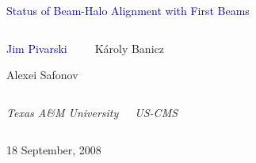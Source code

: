 \documentclass[compress]{beamer}
\begin{document}
\begin{frame}
\vfill
\begin{center}
\textcolor{darkblue}{\Large Status of Beam-Halo Alignment with First Beams}

\vfill
\begin{columns}
\begin{center}
\large
\textcolor{darkblue}{Jim Pivarski}

\vspace{0.2 cm}
Alexei Safonov
\end{center}

\begin{center}
\large
K\'aroly Banicz
\end{center}
\end{columns}

\begin{columns}
\begin{center}
\scriptsize
{\it Texas A\&M University}
\end{center}
\begin{center}
\scriptsize
{\it US-CMS}
\end{center}
\end{columns}

\vfill
18 September, 2008

\end{center}
\end{frame}

\end{document}
